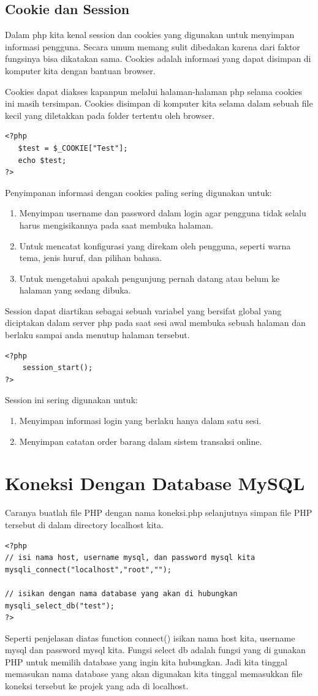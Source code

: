 \subsection{Cookie dan Session}
Dalam php kita kenal session dan cookies yang digunakan untuk menyimpan informasi pengguna. Secara umum memang sulit dibedakan karena dari faktor fungsinya bisa dikatakan sama. Cookies adalah informasi yang dapat disimpan di komputer kita dengan bantuan browser. 
\par 
Cookies dapat diakses kapanpun melalui halaman-halaman php selama cookies ini masih tersimpan. Cookies disimpan di komputer kita selama dalam sebuah file kecil yang diletakkan pada folder tertentu oleh browser. 
\begin{lstlisting}
<?php
   $test = $_COOKIE["Test"];
   echo $test;
?> 
\end{lstlisting}
Penyimpanan informasi dengan cookies paling sering digunakan untuk:
\begin{enumerate}
\item Menyimpan username dan password dalam login agar pengguna tidak selalu harus mengisikannya pada saat membuka halaman.
\item Untuk mencatat konfigurasi yang direkam oleh pengguna, seperti warna tema, jenis huruf, dan pilihan bahasa.
\item Untuk mengetahui apakah pengunjung pernah datang atau belum ke halaman yang sedang dibuka.
\end{enumerate}
Session dapat diartikan sebagai sebuah variabel yang bersifat global yang diciptakan dalam server php pada saat sesi awal membuka sebuah halaman dan berlaku sampai anda menutup halaman tersebut.
\begin{lstlisting}
<?php
    session_start();
?> 
\end{lstlisting}
Session ini sering digunakan untuk:
\begin{enumerate}
\item Menyimpan informasi login yang berlaku hanya dalam satu sesi.
\item Menyimpan catatan order barang dalam sistem transaksi online.
\end{enumerate}

\section{Koneksi Dengan Database MySQL}
Caranya buatlah file PHP dengan nama koneksi.php selanjutnya simpan file PHP tersebut di dalam directory localhost kita.
\begin{lstlisting}
<?php 
// isi nama host, username mysql, dan password mysql kita
mysqli_connect("localhost","root","");
 
// isikan dengan nama database yang akan di hubungkan
mysqli_select_db("test");
?>
\end{lstlisting}
Seperti penjelasan diatas function connect() isikan nama host kita, username mysql dan password mysql kita. Fungsi select db adalah fungsi yang di gunakan PHP untuk memilih database yang ingin kita hubungkan. Jadi kita tinggal memasukan nama database yang akan digunakan kita tinggal memasukkan file koneksi tersebut ke projek yang ada di localhost. 

